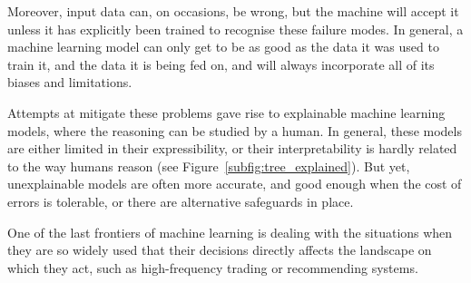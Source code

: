 Moreover, input data can, on occasions, be wrong, but the machine will accept it unless it has explicitly been trained to recognise these failure modes.
In general, a machine learning model can only get to be as good as the data it was used to train it, and the data it is being fed on, and will always incorporate all of its biases and limitations.


Attempts at mitigate these problems gave rise to explainable machine learning models, where the reasoning can be studied by a human.
In general, these models are either limited in their expressibility, or their interpretability is hardly related to the way humans reason (see Figure~\ref{subfig:tree_explained}).
But yet, unexplainable models are often more accurate, and good enough when the cost of errors is tolerable, or there are alternative safeguards in place.


One of the last frontiers of machine learning is dealing with the situations when they are so widely used that their decisions directly affects the landscape on which they act, such as high-frequency trading or recommending systems.
